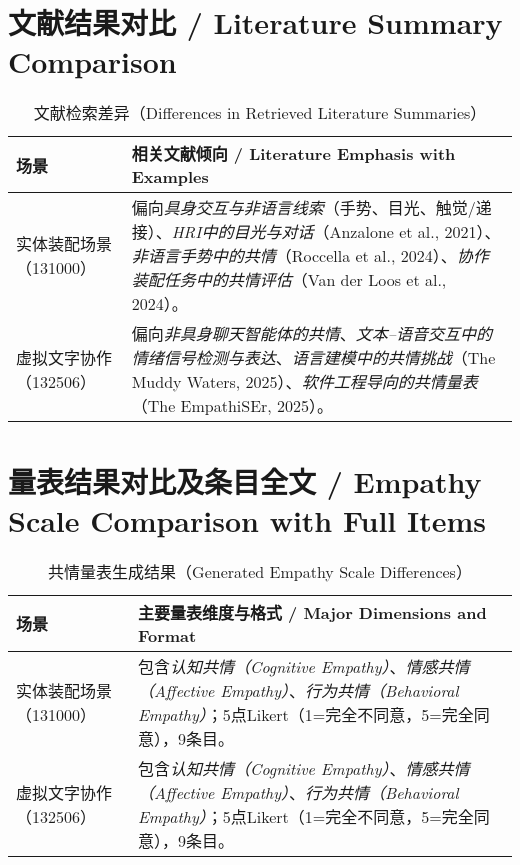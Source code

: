 \documentclass[12pt,a4paper]{article}
\begin{document}
\section{文献结果对比 / Literature Summary Comparison}

\begin{table}[h!]
\centering
\caption{文献检索差异（Differences in Retrieved Literature Summaries）}
\begin{tabularx}{\textwidth}{lX}
\toprule
\textbf{场景} & \textbf{相关文献倾向 / Literature Emphasis with Examples} \\
\midrule
实体装配场景（131000） & 偏向\textit{具身交互与非语言线索}（手势、目光、触觉/递接）、\textit{HRI中的目光与对话}（Anzalone et al., 2021）、\textit{非语言手势中的共情}（Roccella et al., 2024）、\textit{协作装配任务中的共情评估}（Van der Loos et al., 2024）。 \\
\addlinespace
虚拟文字协作（132506） & 偏向\textit{非具身聊天智能体的共情}、\textit{文本–语音交互中的情绪信号检测与表达}、\textit{语言建模中的共情挑战}（The Muddy Waters, 2025）、\textit{软件工程导向的共情量表}（The EmpathiSEr, 2025）。 \\
\bottomrule
\end{tabularx}
\end{table}

\section{量表结果对比及条目全文 / Empathy Scale Comparison with Full Items}

\begin{table}[h!]
\centering
\caption{共情量表生成结果（Generated Empathy Scale Differences）}
\begin{tabularx}{\textwidth}{lX}
\toprule
\textbf{场景} & \textbf{主要量表维度与格式 / Major Dimensions and Format} \\
\midrule
实体装配场景（131000） & 包含\textit{认知共情（Cognitive Empathy）}、\textit{情感共情（Affective Empathy）}、\textit{行为共情（Behavioral Empathy）}；5点Likert（1=完全不同意，5=完全同意），9条目。 \\
\addlinespace
虚拟文字协作（132506） & 包含\textit{认知共情（Cognitive Empathy）}、\textit{情感共情（Affective Empathy）}、\textit{行为共情（Behavioral Empathy）}；5点Likert（1=完全不同意，5=完全同意），9条目。 \\
\bottomrule
\end{tabularx}
\end{table}
\end{document}
